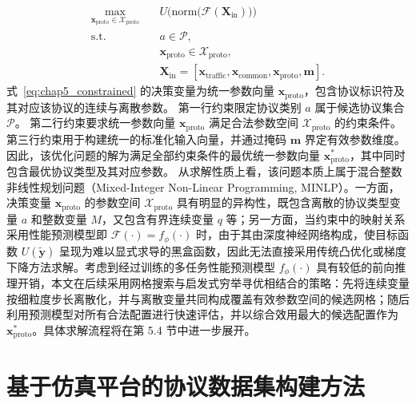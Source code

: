 \begin{equation}
\label{eq:chap5_constrained}
\begin{aligned}
\max_{\mathbf{x}_{\mathrm{proto}}\in\mathcal{X}_{\mathrm{proto}}}
\quad
& U \Big(
\mathrm{norm}
\Big(
\mathcal{F}(\mathbf{X}_{\mathrm{in}})
\Big)
\Big)
\\
\mathrm{s.t.}\quad
&
a\in\mathcal{P},
\\
&
\mathbf{x}_{\mathrm{proto}}\in\mathcal{X}_{\mathrm{proto}},
\\
&
\mathbf{X}_{\mathrm{in}}
=
\left[
\mathbf{x}_{\mathrm{traffic}},
\mathbf{x}_{\mathrm{common}},
\mathbf{x}_{\mathrm{proto}},
\mathbf{m}
\right].
\end{aligned}
\end{equation}
式~\eqref{eq:chap5_constrained} 的决策变量为统一参数向量 $\mathbf{x}_{\mathrm{proto}}$，包含协议标识符及其对应该协议的连续与离散参数。
第一行约束限定协议类别 $a$ 属于候选协议集合 $\mathcal{P}$。
第二行约束要求统一参数向量 $\mathbf{x}_{\mathrm{proto}}$ 满足合法参数空间 $\mathcal{X}_{\mathrm{proto}}$ 的约束条件。
第三行约束用于构建统一的标准化输入向量，并通过掩码 $\mathbf{m}$ 界定有效参数维度。
因此，该优化问题的解为满足全部约束条件的最优统一参数向量 $\mathbf{x}_{\mathrm{proto}}^*$，其中同时包含最优协议类型及其对应参数。
从求解性质上看，该问题本质上属于混合整数非线性规划问题（Mixed-Integer Non-Linear Programming, MINLP）。一方面，决策变量 $\mathbf{x}_{\mathrm{proto}}$ 的参数空间 $\mathcal{X}_{\mathrm{proto}}$ 具有明显的异构性，既包含离散的协议类型变量 $a$ 和整数变量 $M$，又包含有界连续变量 $q$ 等；另一方面，当约束中的映射关系采用性能预测模型即 $\mathcal{F}(\cdot)=f_{\phi}(\cdot)$ 时，由于其由深度神经网络构成，使目标函数 $U(\tilde{\mathbf{y}})$ 呈现为难以显式求导的黑盒函数，因此无法直接采用传统凸优化或梯度下降方法求解。考虑到经过训练的多任务性能预测模型 $f_{\phi}(\cdot)$ 具有较低的前向推理开销，本文在后续采用网格搜索与启发式穷举寻优相结合的策略：先将连续变量按细粒度步长离散化，并与离散变量共同构成覆盖有效参数空间的候选网格；随后利用预测模型对所有合法配置进行快速评估，并以综合效用最大的候选配置作为 $\mathbf{x}_{\mathrm{proto}}^*$。具体求解流程将在第 5.4 节中进一步展开。



\section{基于仿真平台的协议数据集构建方法}
\label{sec:simulation_data}

